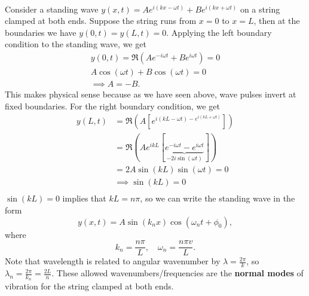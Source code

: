 \documentclass[../classical_mechanics.tex]{subfiles}
\begin{document}
        \paragraph{}
        Consider a standing wave $y(x,t)=Ae^{i(kx-\omega t)}+Be^{i(kx+\omega t)}$ on a string clamped at both ends.
        Suppose the string runs from $x=0$ to $x=L$, then at the boundaries we have $y(0,t)=y(L,t)=0$.
        Applying the left boundary condition to the standing wave, we get
        \begin{gather}
            y(0,t)=\Re(Ae^{-i\omega t}+Be^{i\omega t})=0\\
            A\cos(\omega t)+B\cos(\omega t)=0\\
            \implies A=-B.
        \end{gather}
        This makes physical sense because as we have seen above, wave pulses invert at fixed boundaries.
        For the right boundary condition, we get
        \begin{align}
            y(L,t)&=\Re(A[e^{i(kL-\omega t)-e^{i(kL+\omega t)}}])\\
            &=\Re(Ae^{ikL}[\underbrace{e^{-i\omega t}-e^{i\omega t}}_{-2i\sin(\omega t)}])\\
            &=2A\sin(kL)\sin(\omega t)=0\\
            &\implies\sin(kL)=0\\
        \end{align}
        $\sin(kL)=0$ implies that $kL=n\pi$, so we can write the standing wave in the form
        \begin{equation}
            y(x,t)=A\sin(k_n x)\cos(\omega_n t+\phi_0),
        \end{equation}
        where
        \begin{equation}
            k_n=\frac{n\pi}{L},\quad\omega_n=\frac{n\pi v}{L}.
        \end{equation}
        Note that wavelength is related to angular wavenumber by $\lambda=\frac{2\pi}{k}$, so $\lambda_n=\frac{2\pi}{k_n}=\frac{2L}{n}$.
        These allowed wavenumbers/frequencies are the \textbf{normal modes} of vibration for the string clamped at both ends.
\end{document}
